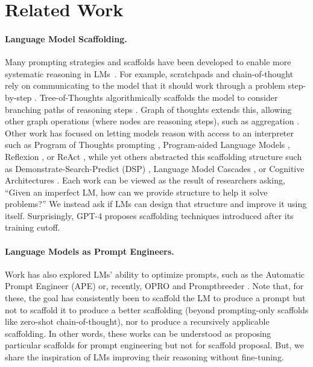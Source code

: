 \documentclass{article} %
\begin{document}
%
\section{Related Work}
%
\paragraph{Language Model Scaffolding.}
Many prompting strategies and scaffolds have been developed to enable more systematic reasoning in LMs~\citep{wei_chain_2022,yao2022react,yao2023tree,zelikman2022parsel,chen2022program,zhou2022least,khattab2022demonstrate,jiang2022draft,sel2023algorithm,besta2023graph,poesia2023certified}. For example, scratchpads and chain-of-thought rely on communicating to the model that it should work through a problem step-by-step \citep{nye2021show,wei_chain_2022}. Tree-of-Thoughts algorithmically scaffolds the model to consider branching paths of reasoning steps \citep{yao2023tree}. Graph of thoughts extends this, allowing other graph operations (where nodes are reasoning steps), such as aggregation \citep{besta2023graph}. Other work has focused on letting models reason with access to an interpreter such as Program of Thoughts prompting \citep{chen2022program}, Program-aided Language Models \citep{gao2023pal}, Reflexion \citep{shinn2023reflexion}, or ReAct \citep{yao2022react}, while yet others abstracted this scaffolding structure such as Demonstrate-Search-Predict (DSP) \citep{khattab2022demonstrate}, Language Model Cascades \citep{dohan2022language}, or Cognitive Architectures \citep{sumers2023cognitive}. Each work can be viewed as the result of researchers asking, ``Given an imperfect LM, how can we provide structure to help it solve problems?'' We instead ask if LMs can design that structure and improve it using itself. Surprisingly, GPT-4 proposes scaffolding techniques introduced after its training cutoff.

\paragraph{Language Models as Prompt Engineers.}

Work has also explored LMs' ability to optimize prompts, such as the Automatic Prompt Engineer (APE) \citep{zhou2022large} or, recently, OPRO \citep{yang2023large} and Promptbreeder \citep{fernando2023promptbreeder}. Note that, for these, the goal has consistently been to scaffold the LM to produce a prompt but not to scaffold it to produce a better scaffolding (beyond prompting-only scaffolds like zero-shot chain-of-thought), nor to produce a recursively applicable scaffolding. In other words, these works can be understood as proposing particular scaffolds for prompt engineering but not for scaffold proposal. But, we share the inspiration of LMs improving their reasoning without fine-tuning.\vspace{-1px}
 
\end{document}
